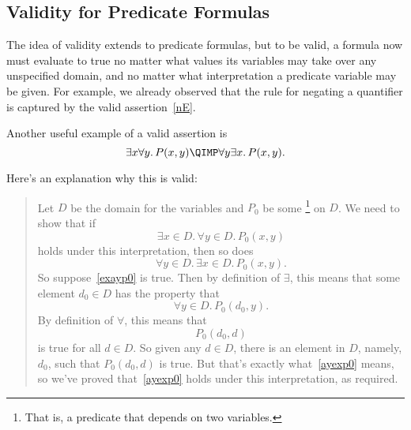 \iffalse
Logicians have worked very hard to define strict rules for the
use of logic notation so that ideas can be expressed with absolute rigor.
It's all quite charming and clever.  However, the sad irony is that
applied mathematicans usually use their beloved notation as a crude
shorthand, breaking the rules and abusing the notation willy-nilly ---sort
of like pounding nails with fine china.
\fi

\subsection{Validity for Predicate Formulas}

\iffalse
A propositional formula is called \term{valid} when it evaluates to \true\
no matter what truth values are assigned to the individual propositional
variables.  For example, the propositional version of the \idx{Distributive Law}
is that $P \QAND (Q \QOR R)$ is equivalent to $(P \QAND Q) \QOR (P \QAND
R)$.  This is the same as saying that
\[
[P \QAND (Q \QOR R)] \QIFF [(P \QAND Q) \QOR (P \QAND R)]
\]
is valid.
\fi

The idea of validity extends to predicate formulas, but to be valid, a
formula now must evaluate to true no matter what values its variables
may take over any unspecified domain, and no matter what
interpretation a predicate variable may be given.  For example, we
already observed that the rule for negating a quantifier is captured
by the valid assertion~\eqref{nE}.

Another useful example of a valid assertion is
\begin{equation}\label{eaimpliesae}
\exists x \forall y.\, P(x,y) \QIMP \forall y \exists x.\, P(x,y).
\end{equation}

Here's an explanation why this is valid:

\begin{quote}
Let $D$ be the domain for the variables and $P_0$ be some
\footnote{That is, a predicate that depends on two variables.}
on $D$.  We need to show that if
\begin{equation}\label{exayp0}
\exists x \in D.\, \forall y \in D.\, P_0(x,y)
\end{equation}
holds under this interpretation, then so does
\begin{equation}\label{ayexp0}
\forall y \in D.\, \exists x \in D.\, P_0(x,y).
\end{equation}
So suppose~\eqref{exayp0} is true.  Then by definition of $\exists$, this
means that some element $d_0 \in D$ has the property that
\[
\forall y \in D.\, P_0(d_0, y).
\]
By definition of $\forall$, this means that
\[
P_0(d_0,d)
\]
is true for all $d \in D$.  So given any $d \in D$, there is an element in
$D$, namely, $d_0$, such that $P_0(d_0,d)$ is true.  But that's exactly
what~\eqref{ayexp0} means, so we've proved that~\eqref{ayexp0} holds under
this interpretation, as required.
\end{quote}

